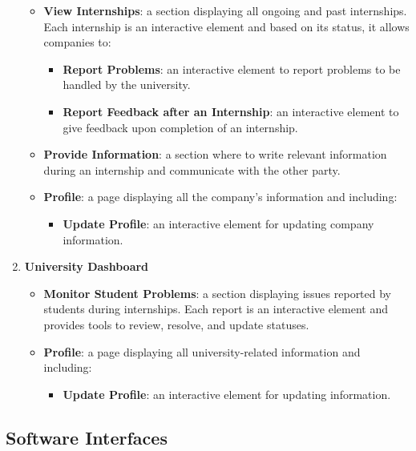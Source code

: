 \begin{enumerate}
\begin{itemize}
        \item \textbf{View Internships}: a section displaying all ongoing and past internships. Each internship is an interactive element and based on its status, it allows companies to:
        \begin{itemize}
            \item \textbf{Report Problems}: an interactive element to report problems to be handled by the university.
            \item \textbf{Report Feedback after an Internship}: an interactive element to give feedback upon completion of an internship.
        \end{itemize}
        \item \textbf{Provide Information}: a section where to write relevant information during an internship and communicate with the other party.
        \item \textbf{Profile}: a page displaying all the company's information and including:
        \begin{itemize}
            \item \textbf{Update Profile}: an interactive element for updating company information.
        \end{itemize}  
    \end{itemize}

    \item \textbf{University Dashboard}
    \begin{itemize}  
        \item \textbf{Monitor Student Problems}: a section displaying issues reported by students during internships. Each report is an interactive element and provides tools to review, resolve, and update statuses.
        \item \textbf{Profile}: a page displaying all university-related information and including:
        \begin{itemize}
            \item \textbf{Update Profile}: an interactive element for updating information.
        \end{itemize} 
    \end{itemize}
\end{enumerate}

\subsection{Software Interfaces}
\label{subsec:software_interfaces}


